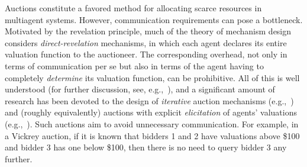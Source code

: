 \documentclass{aamas2013}
\begin{document}
Auctions constitute a favored method for allocating scarce resources in
multiagent systems.  However, communication requirements can pose a
bottleneck.  Motivated by the revelation principle, much of the theory of
mechanism design considers {\em direct-revelation} mechanisms, in which
each agent declares its entire valuation function to the auctioneer.  The
corresponding overhead, not only in terms of communication per se but also
in terms of the agent having to completely {\em determine} its valuation
function, can be prohibitive.  All of this is well understood (for further
discussion, see, e.g.,~\cite{Conitzer04:Computational}), and a significant amount of research has been
devoted to the design of {\em iterative} auction mechanisms (e.g.,~\cite{Parkes06:Iterative}) and (roughly
equivalently) auctions with explicit {\em elicitation} of agents'
valuations (e.g.,~\cite{Sandholm06:Preference}).  Such auctions aim to avoid
unnecessary communication.  For example, in a Vickrey auction, if it is known
that bidders 1 and 2 have valuations above \$100 and bidder 3 has one below
\$100, then there is no need to query bidder 3 any further.
\end{document}
